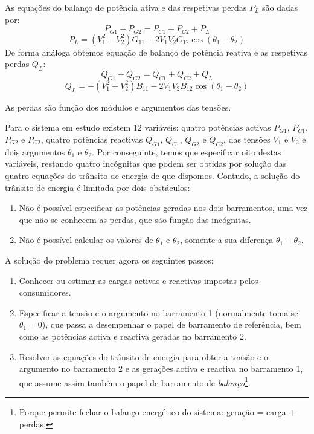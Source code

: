 \noindent As equações do balanço de potência ativa e das respetivas perdas $P_L$ são dadas por:
$$
    P_{G1} + P_{G2} = P_{C1} + P_{C2} + P_L
$$
$$
    P_L = (V_1^2 + V_2^2) G_{11} + 2 V_1 V_2 G_{12} \cos(\theta_1 - \theta_2)
$$
\noindent De forma análoga obtemos equação de balanço de potência reativa e as respetivas perdas $Q_L$:
$$
    Q_{G1} + Q_{G2} = Q_{C1} + Q_{C2} + Q_L
$$
$$
    Q_L = - (V_1^2 + V_2^2) B_{11} - 2 V_1 V_2 B_{12} \cos(\theta_1 - \theta_2)
$$

\noindent As perdas são função dos módulos e argumentos das tensões.

\noindent Para o sistema em estudo existem 12 variáveis: quatro potências activas \(P_{G1}\), \(P_{C1}\), \(P_{G2}\) e \(P_{C2}\), quatro potências reactivas \(Q_{G1}\), \(Q_{C1}\), \(Q_{G2}\) e \(Q_{C2}\), das tensões \(V_1\) e \(V_2\) e dois argumentos \(\theta_1\) e \(\theta_2\). Por conseguinte, temos que especificar oito destas variáveis, restando quatro incógnitas que podem ser obtidas por solução das quatro equações do trânsito de energia de que dispomos. Contudo, a solução do trânsito de energia é limitada por dois obstáculos:

\begin{enumerate}
    \item Não é possível especificar as potências geradas nos dois barramentos, uma vez que não se conhecem as perdas, que são função das incógnitas.
    
    \item Não é possível calcular os valores de \(\theta_1\) e \(\theta_2\), somente a sua diferença \(\theta_1 - \theta_2\).
\end{enumerate}

\begin{mdframed}
    A solução do problema requer agora os seguintes passos:
    \begin{enumerate}
        \item Conhecer ou estimar as cargas activas e reactivas impostas pelos consumidores.
        
        \item Especificar a tensão e o argumento no barramento 1 (normalmente toma-se \(\theta_1 = 0\)), que passa a desempenhar o papel de barramento de referência, bem como as potências activa e reactiva geradas no barramento 2.
        
        \item Resolver as equações do trânsito de energia para obter a tensão e o argumento no barramento 2 e as gerações activa e reactiva no barramento 1, que assume assim também o papel de barramento de \textit{balanço}\footnote{Porque permite fechar o balanço energético do sistema: geração = carga + perdas.}.
    \end{enumerate}
\end{mdframed}

